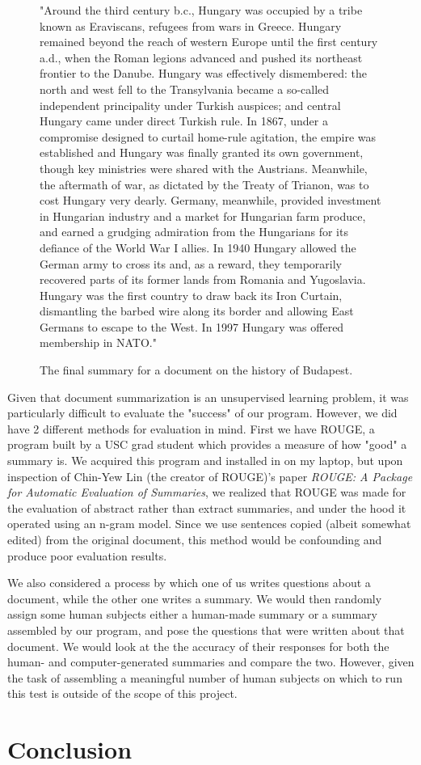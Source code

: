 \documentclass[12pt]{article}
\theoremstyle{plain}
\theoremstyle{definition}
\theoremstyle{remark}
\theoremstyle{plain}
\begin{document}
\begin{figure}
	
"Around the third century b.c., Hungary was occupied by a tribe known as Eraviscans, refugees from wars in Greece. Hungary remained beyond the reach of western Europe until the first century a.d., when the Roman legions advanced and pushed its northeast frontier to the Danube. Hungary was effectively dismembered: the north and west fell to the Transylvania became a so-called independent principality under Turkish auspices; and central Hungary came under direct Turkish rule. In 1867, under a compromise designed to curtail home-rule agitation, the empire was established and Hungary was finally granted its own government, though key ministries were shared with the Austrians. Meanwhile, the aftermath of war, as dictated by the Treaty of Trianon, was to cost Hungary very dearly. Germany, meanwhile, provided investment in Hungarian industry and a market for Hungarian farm produce, and earned a grudging admiration from the Hungarians for its defiance of the World War I allies. In 1940 Hungary allowed the German army to cross its and, as a reward, they temporarily recovered parts of its former lands from Romania and Yugoslavia. Hungary was the first country to draw back its Iron Curtain, dismantling the barbed wire along its border and allowing East Germans to escape to the West. In 1997 Hungary was offered membership in NATO."
\caption{The final summary for a document on the history of Budapest.}\label{goodsummary}
\end{figure}
 


	Given that document summarization is an unsupervised learning problem, it was particularly difficult to evaluate the "success" of our program. However, we did have 2 different methods for evaluation in mind. First we have ROUGE, a program built by a USC grad student which provides a measure of how "good" a summary is. We acquired this program and installed in on my laptop, but upon inspection of Chin-Yew Lin (the creator of ROUGE)'s paper \emph{ROUGE: A Package for Automatic Evaluation of Summaries}, we realized that ROUGE was made for the evaluation of abstract rather than extract summaries, and under the hood it operated using an n-gram model. Since we use sentences copied (albeit somewhat edited) from the original document, this method would be confounding and produce poor evaluation results.
	
We also considered a process by which one of us writes questions about a document, while the other one writes a summary. We would then randomly assign some human subjects either a human-made summary or a summary assembled by our program, and pose the questions that were written about that document. We would look at the the accuracy of their responses for both the human- and computer-generated summaries and compare the two. However, given the task of assembling a meaningful number of human subjects on which to run this test is outside of the scope of this project.



\section{Conclusion}
	
\end{document}
